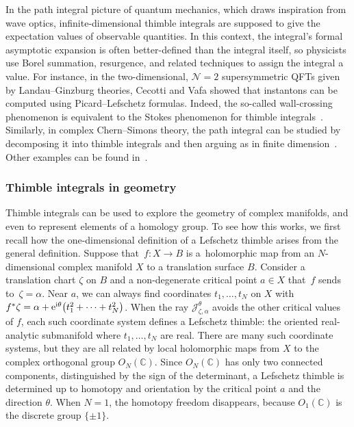 \documentclass[pdftex]{sigma}
\newcommand{\maps}{\colon}
\newcommand{\C}{\mathbb{C}}
\numberwithin{equation}{section}
\begin{document}
In the path integral picture of quantum mechanics, which draws inspiration from wave optics, infinite-dimensional thimble integrals are supposed to give the expectation values of observable quantities. In this context, the integral's formal asymptotic expansion is often better-defined than the integral itself, so physicists use Borel summation, resurgence, and related techniques to assign the integral a value. For instance, in the two-dimensional, $\mathcal{N}=2$ supersymmetric QFTs given by Landau--Ginzburg theories, Cecotti and Vafa showed that instantons can be computed using Picard--Lefschetz formulas. Indeed, the so-called wall-crossing phenomenon is equivalent to the Stokes phenomenon for thimble integrals~\cite{Cecotti:1992rm}. Similarly, in complex Chern--Simons theory, the path integral can be studied by decomposing it into thimble integrals and then arguing as in finite dimension~\cite{gukov-marino-purtrov-resurgence,Witten}. Other examples can be found in~\cite{Unsal--resurgence-gauge,dunne-unsal2,Berry1991,Berry_Howls,costin_kruskal,dunne-unsal,Fauvet_Menous_Queva,Garoufalidis--CS,GGM,GTM--CS,Howls,Howls97,pham1988resurgence,Tanizaki:2014tua}.
%
\subsubsection{Thimble integrals in geometry}
Thimble integrals can be used to explore the geometry of complex manifolds, and even to represent elements of a homology group. To see how this works, we first recall how the one-dimensional definition of a Lefschetz thimble arises from the general definition. Suppose that~${f \maps X \to B}$ is a~holomorphic map from an $N$-dimensional complex manifold $X$ to a translation surface $B$. Consider a translation chart $\zeta$ on $B$ and a non-degenerate critical point $a \in X$ that~$f$ sends to~${\zeta = \alpha}$. Near $a$, we can always find coordinates $t_1, \dots, t_N$ on $X$ with
$ f^*\zeta = \alpha + {\rm e}^{{\rm i} \theta} \bigl(t_1^2 + \cdots + t_N^2\bigr)$.
When the ray $\mathcal{J}_{\zeta, \alpha}^\theta$ avoids the other critical values of $f$, each such coordinate system defines a Lefschetz thimble: the oriented real-analytic submanifold where $t_1, \dots, t_N$ are real. There are many such coordinate systems, but they are all related by local holomorphic maps from $X$ to the complex orthogonal group $O_N(\C)$. Since $O_N(\C)$ has only two connected components, distinguished by the sign of the determinant, a Lefschetz thimble is determined up to homotopy and orientation by the critical point $a$ and the direction $\theta$. When $N = 1$, the homotopy freedom disappears, because $O_1(\C)$ is the discrete group $\{\pm 1\}$.
\end{document}

